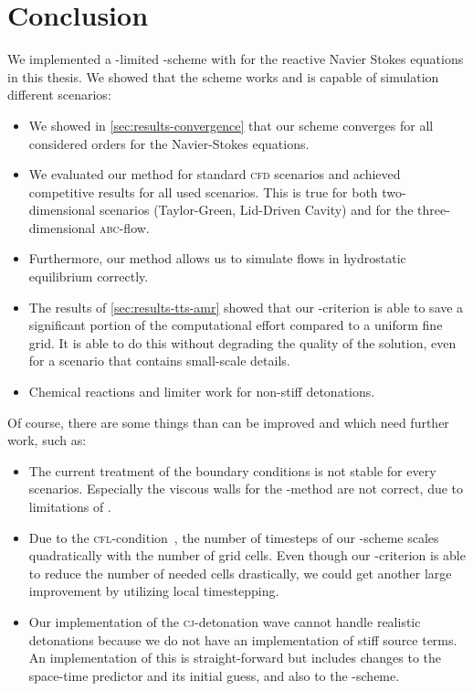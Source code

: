 \chapter{Conclusion}\label{chap:conclusion}
We implemented a \muscl{}-limited \aderdg{}-scheme with \amr{} for the reactive Navier Stokes equations in this thesis.
We showed that the scheme works and is capable of simulation different scenarios:
\begin{itemize}
\item We showed in \cref{sec:results-convergence} that our scheme converges for all considered orders for the Navier-Stokes equations.
\item We evaluated our method for standard \textsc{cfd} scenarios and achieved competitive results for all used scenarios.
  This is true for both two-dimensional scenarios (Taylor-Green, Lid-Driven Cavity) and for the three-dimensional \textsc{abc}-flow.
\item Furthermore, our method allows us to simulate flows in hydrostatic equilibrium correctly.
\item The results of \cref{sec:results-tts-amr} showed that our \amr{}-criterion is able to save a significant portion of the computational effort compared to a uniform fine grid.
  It is able to do this without degrading the quality of the solution, even for a scenario that contains small-scale details.
\item Chemical reactions and limiter work for non-stiff detonations.
\end{itemize}

Of course, there are some things than can be improved and which need further work, such as:
\begin{itemize}
\item The current treatment of the boundary conditions is not stable for every scenarios.
  Especially the viscous walls for the \muscl{}-method are not correct, due to limitations of \exahype{}.
\item Due to the \textsc{cfl}-condition~, the number of timesteps of our \aderdg{}-scheme scales quadratically with the number of grid cells.
  Even though our \amr{}-criterion is able to reduce the number of needed cells drastically, we could get another large improvement by utilizing local timestepping.
\item Our implementation of the \textsc{cj}-detonation wave cannot handle realistic detonations because we do not have an implementation of stiff source terms.
  An implementation of this is straight-forward but includes changes to the space-time predictor and its initial guess, and also to the \muscl{}-scheme.
\end{itemize}

